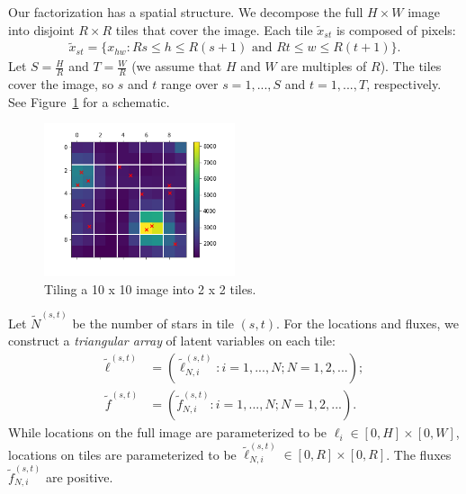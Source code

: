 Our factorization has a spatial structure. We decompose the full $H \times W$ image into disjoint $R \times R$ tiles that cover the image. Each tile $\tilde x_{st}$ is composed of pixels:
\begin{align}
    \tilde x_{st} = \{x_{hw} : Rs \leq h \leq R(s+1) \text{ and } Rt \leq w \leq R(t+1)\}.
    \label{eq:tiles}
\end{align}
Let $S = \frac{H}{R}$ and $T = \frac{W}{R}$ (we assume that $H$ and $W$ are multiples of $R$). The tiles cover the image, so $s$ and $t$ range over $s = 1, ..., S$ and $t = 1, ..., T$, respectively. See Figure~\ref{fig:ex_tiles} for a schematic.
\begin{figure}[!ht]
    \centering
    \includegraphics[width = 0.5\textwidth]{figures/example_tiled.png}
    \vspace{-1cm}
    \caption{Tiling a 10 x 10 image into 2 x 2 tiles.}
    \label{fig:ex_tiles}
\end{figure}

Let $\tilde N^{(s, t)}$ be the number of stars in tile 
$(s,t)$. 
For the locations and fluxes, we construct a {\itshape triangular array}  of latent variables on each tile:
\begin{align}
    \tilde\ell^{(s, t)} &= (\tilde\ell_{N, i}^{(s, t)} : i = 1, ..., N; N = 1, 2, ...); \\
    \tilde f^{(s, t)} &= (\tilde f_{N, i}^{(s, t)} : i = 1, ..., N; N = 1, 2, ...).
\end{align}
While locations on the full image are parameterized to be
$\ell_i \in [0, H]\times[0, W]$, locations on tiles are parameterized to be $\tilde\ell_{N, i}^{(s, t)} \in [0, R]\times[0, R]$. The fluxes $\tilde f_{N, i}^{(s, t)}$ are positive. 

